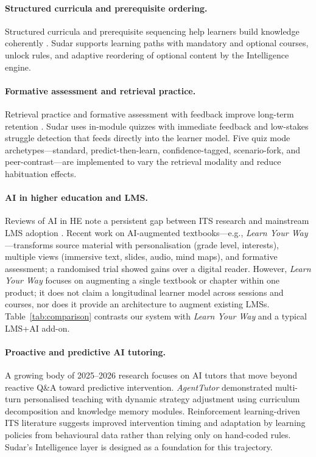 \documentclass[10pt,twocolumn]{article}
\begin{document}
\paragraph{Structured curricula and prerequisite ordering.}
Structured curricula and prerequisite sequencing help learners build
knowledge coherently \cite{gagne1985}. Sudar supports learning paths
with mandatory and optional courses, unlock rules, and adaptive
reordering of optional content by the Intelligence engine.

\paragraph{Formative assessment and retrieval practice.}
Retrieval practice and formative assessment with feedback improve
long-term retention \cite{roediger2006,black1998}. Sudar uses
in-module quizzes with immediate feedback and low-stakes struggle
detection that feeds directly into the learner model. Five quiz mode
archetypes---standard, predict-then-learn, confidence-tagged,
scenario-fork, and peer-contrast---are implemented to vary the
retrieval modality and reduce habituation effects.

\paragraph{AI in higher education and LMS.}
Reviews of AI in HE note a persistent gap between ITS research and
mainstream LMS adoption \cite{zawacki2019}. Recent work on
AI-augmented textbooks---e.g., \emph{Learn Your Way}
\cite{learnyourway2025}---transforms source material with
personalisation (grade level, interests), multiple views (immersive
text, slides, audio, mind maps), and formative assessment; a
randomised trial showed gains over a digital reader. However,
\emph{Learn Your Way} focuses on augmenting a single textbook or
chapter within one product; it does not claim a longitudinal learner
model across sessions and courses, nor does it provide an architecture
to augment existing LMSs. Table~\ref{tab:comparison} contrasts our
system with \emph{Learn Your Way} and a typical LMS+AI add-on.

\paragraph{Proactive and predictive AI tutoring.}
A growing body of 2025--2026 research focuses on AI tutors that move
beyond reactive Q\&A toward predictive intervention.
\emph{AgentTutor} \cite{liu2026agenttutor} demonstrated multi-turn
personalised teaching with dynamic strategy adjustment using curriculum
decomposition and knowledge memory modules. Reinforcement
learning-driven ITS literature suggests improved intervention timing and
adaptation by learning policies from behavioural data rather than
relying only on hand-coded rules. Sudar's Intelligence
layer is designed as a foundation for this trajectory.
\end{document}
